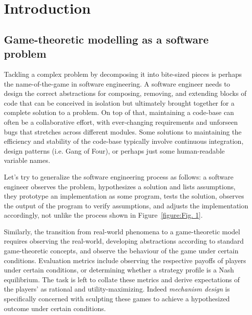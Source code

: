 \section{Introduction}


\subsection{Game-theoretic modelling as a software problem}

Tackling a complex problem by decomposing it into bite-sized pieces is perhaps the name-of-the-game in software engineering. A software engineer needs to design the correct abstractions for composing, removing, and extending blocks of code that can be conceived in isolation but ultimately brought together for a complete solution to a problem. On top of that, maintaining a code-base can often be a collaborative effort, with ever-changing requirements and unforseen bugs that stretches across different modules. Some solutions to maintaining the efficiency and stability of the code-base typically involve continuous integration, design patterns (i.e. Gang of Four), or perhaps just some human-readable variable names. 

Let's try to generalize the software engineering process as follows: a software engineer observes the problem, hypothesizes a solution and lists assumptions, they prototype an implementation as some program, tests the solution, observes the output of the program to verify assumptions, and adjusts the implementation accordingly, not unlike the process shown in Figure~\ref{figure:Fig. 1}. 

Similarly, the transition from real-world phenomena to a game-theoretic model requires observing the real-world, developing abstractions according to standard game-theoretic concepts, and observe the behaviour of the game under certain conditions. Evaluation metrics include observing the respective payoffs of players under certain conditions, or determining whether a strategy profile is a Nash equilibrium. The task is left to collate these metrics and derive expectations of the players' as rational and utility-maximizing. Indeed \textit{mechanism design} is specifically concerned with sculpting these games to achieve a hypothesized outcome under certain conditions. 


